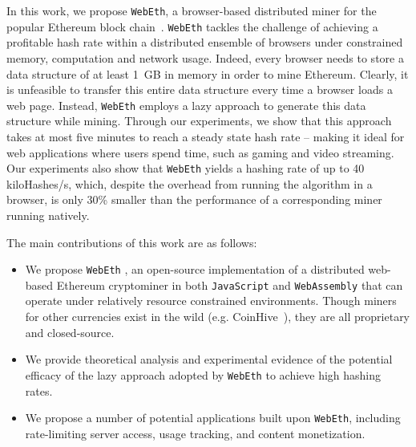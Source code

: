 \documentclass[runningheads]{llncs}
\begin{document}
In this work, we propose \verb|WebEth|, a browser-based distributed miner for the popular Ethereum block chain~\cite{ethereum}. \verb|WebEth| tackles the challenge of achieving a profitable hash rate within a distributed ensemble of browsers under constrained memory, computation and network usage. Indeed, every browser needs to store a data structure of at least 1~GB in memory in order to mine Ethereum. Clearly, it is unfeasible to transfer this entire data structure every time a browser loads a web page. Instead, \verb|WebEth| employs a lazy approach to generate this data structure while mining. Through our experiments, we show that this approach takes at most five minutes to reach a steady state hash rate -- making it ideal for web applications where users spend time, such as gaming and video streaming. Our experiments also show that \verb|WebEth| yields a hashing rate of up to 40 kiloHashes/s, which, despite the overhead from running the algorithm in a browser, is only 30\% smaller than the performance of a corresponding miner running natively. 

The main contributions of this work are as follows:
\begin{itemize}
\item We propose \verb|WebEth| \cite{WebEth}, an open-source implementation of a distributed web-based Ethereum cryptominer in both \verb|JavaScript| and \verb|WebAssembly| that can operate under relatively resource constrained environments. Though miners for other currencies exist in the wild (e.g. CoinHive~\cite{coinhive}), they are all proprietary and closed-source.
\item We provide theoretical analysis and experimental evidence of the potential efficacy of the lazy approach adopted by \verb|WebEth| to achieve high hashing rates.
\item We propose a number of potential applications built upon \verb|WebEth|, including rate-limiting server access, usage tracking, and content monetization.
\end{itemize}
\end{document}
